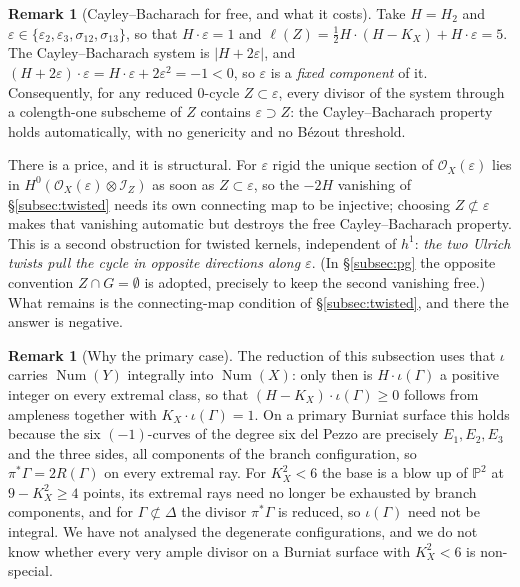 \documentclass{amsart}
\theoremstyle{definition}
\newtheorem{remark}[theorem]{Remark}
\newcommand{\OO}{\mathcal{O}}
\newcommand{\II}{\mathcal{I}}
\newcommand{\PP}{\mathbb{P}}
\newcommand{\Num}{\operatorname{Num}}
\newcommand{\len}{\ell}
\begin{document}
\begin{remark}[Cayley--Bacharach for free, and what it costs]\label{rem:CBfree}
Take $H=H_2$ and $\varepsilon\in\{\varepsilon_2,\varepsilon_3,\sigma_{12},\sigma_{13}\}$, so that $H\cdot\varepsilon=1$ and $\len(Z)=\tfrac12H\cdot(H-K_X)+H\cdot\varepsilon=5$. The Cayley--Bacharach system is $|H+2\varepsilon|$, and $(H+2\varepsilon)\cdot\varepsilon=H\cdot\varepsilon+2\varepsilon^2=-1<0$, so $\varepsilon$ is a \emph{fixed component} of it. Consequently, for any reduced $0$-cycle $Z\subset\varepsilon$, every divisor of the system through a colength-one subscheme of $Z$ contains $\varepsilon\supset Z$: the Cayley--Bacharach property holds automatically, with no genericity and no B\'ezout threshold.

There is a price, and it is structural. For $\varepsilon$ rigid the unique section of $\OO_X(\varepsilon)$ lies in $H^0(\OO_X(\varepsilon)\otimes\II_Z)$ as soon as $Z\subset\varepsilon$, so the $-2H$ vanishing of \S\ref{subsec:twisted} needs its own connecting map to be injective; choosing $Z\not\subset\varepsilon$ makes that vanishing automatic but destroys the free Cayley--Bacharach property. This is a second obstruction for twisted kernels, independent of $h^1$: \emph{the two Ulrich twists pull the cycle in opposite directions along $\varepsilon$}. (In \S\ref{subsec:pg} the opposite convention $Z\cap G=\emptyset$ is adopted, precisely to keep the second vanishing free.) What remains is the connecting-map condition of \S\ref{subsec:twisted}, and there the answer is negative.
\end{remark}

\begin{remark}[Why the primary case]\label{rem:integrality}
The reduction of this subsection uses that $\iota$ carries $\Num(Y)$ integrally into $\Num(X)$: only then is $H\cdot\iota(\Gamma)$ a positive integer on every extremal class, so that $(H-K_X)\cdot\iota(\Gamma)\ge0$ follows from ampleness together with $K_X\cdot\iota(\Gamma)=1$. On a primary Burniat surface this holds because the six $(-1)$-curves of the degree six del Pezzo are precisely $E_1,E_2,E_3$ and the three sides, all components of the branch configuration, so $\pi^*\Gamma=2R(\Gamma)$ on every extremal ray. For $K_X^2<6$ the base is a blow up of $\PP^2$ at $9-K_X^2\ge4$ points, its extremal rays need no longer be exhausted by branch components, and for $\Gamma\not\subset\Delta$ the divisor $\pi^*\Gamma$ is reduced, so $\iota(\Gamma)$ need not be integral. We have not analysed the degenerate configurations, and we do not know whether every very ample divisor on a Burniat surface with $K_X^2<6$ is non-special.
\end{remark}
\end{document}
